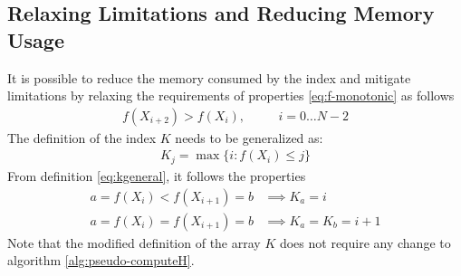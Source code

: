 \documentclass[preprint,1p,times]{elsarticle}
\begin{document}
\subsection{Relaxing Limitations and Reducing Memory Usage}
\label{sec:bucketpairs}
It is possible to reduce the memory consumed by the index and mitigate limitations by relaxing the requirements of properties \eqref{eq:f-monotonic} as follows
\begin{align}
\label{eq:f-monotonic-2}
f(X_{i+2}) > f(X_i), &&\quad  i=0 \dots N-2
\end{align}
The definition of the index $K$ needs to be generalized as:
\begin{align}
\label{eq:kgeneral}
	K_j = \max\{i: f(X_i) \leq j\}
\end{align}
From definition \eqref{eq:kgeneral}, it follows the properties
\begin{subequations}
\label{eq:kgeneralprop}
\begin{align}
\label{eq:kgeneralprop1}
    a=f(X_{i})<f(X_{i+1})=b &\implies K_a=i \\
\label{eq:kgeneralprop2}    
    a=f(X_{i})=f(X_{i+1})=b &\implies K_a=K_b=i+1
\end{align}
\end{subequations}
Note that the modified definition of the array $K$ does not require any change to algorithm \eqref{alg:pseudo-computeH}. \\
\end{document}
